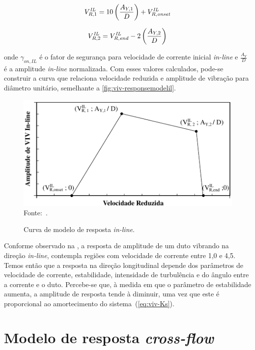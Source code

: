 \begin{equation}
V_{R, 1}^\mathit{IL} = 10 \left(\frac{A_{Y, 1}}{D}\right)+ V_{R,\mathit{onset}}^\mathit{IL}\\
\end{equation}

\begin{equation}
V_{R, 2}^\mathit{IL} =  V_{R, \mathit{end}}^\mathit{IL} - 2 \left(\frac{A_{Y, 2}}{D}\right)\\
\end{equation}

onde $\gamma_{\mathit{on}, \mathit{IL}}$ é o fator de segurança para velocidade de corrente inicial \textit{in-line} e $\frac{A_Y}{D}$ é a amplitude \textit{in-line} normalizada. Com esses valores calculados, pode-se construir a curva que relaciona velocidade reduzida e amplitude de vibração para diâmetro unitário, semelhante a \autoref{fig:viv-responsemodelil}.

\begin{figure}[th!]
    \centering
    \caption{Curva de modelo de resposta \textit{in-line}.}\label{fig:viv-responsemodelil}
    \includegraphics[width=0.8\linewidth]{imagens/response_model_IL}
    \\Fonte:~.
\end{figure}

Conforme observado na , a resposta de amplitude de um duto vibrando na direção \textit{in-line}, contempla regiões com velocidade de corrente entre 1,0 e 4,5.
Temos então que a resposta na direção longitudinal depende dos parâmetros de velocidade de corrente, estabilidade, intensidade de turbulência e do ângulo entre a corrente e o duto.
Percebe-se que, à medida em que o parâmetro de estabilidade aumenta, a amplitude de resposta tende à diminuir, uma vez que este é proporcional ao amortecimento do sistema~(\autoref{eq:viv-Ks}).


\section{Modelo de resposta \textit{cross-flow}}

